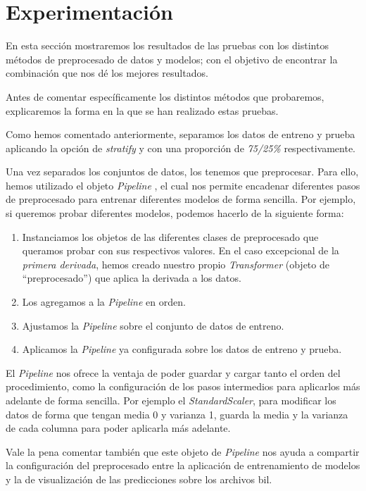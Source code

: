 \section{Experimentación}

En esta sección mostraremos los resultados de las pruebas con los distintos métodos de preprocesado de datos y modelos; con el objetivo de encontrar la combinación que nos dé los mejores resultados.

Antes de comentar específicamente los distintos métodos que probaremos, explicaremos la forma en la que se han realizado estas pruebas.

Como hemos comentado anteriormente, separamos los datos de entreno y prueba aplicando la opción de \textit{stratify} y con una proporción de \textit{75/25\%} respectivamente.

Una vez separados los conjuntos de datos, los tenemos que preprocesar. Para ello, hemos utilizado el objeto \textit{Pipeline} \cite{sklearnp32:online}, el cual nos permite encadenar diferentes pasos de preprocesado para entrenar diferentes modelos de forma sencilla. Por ejemplo, si queremos probar diferentes modelos, podemos hacerlo de la siguiente forma: 

\begin{enumerate}
    \item Instanciamos los objetos de las diferentes clases de preprocesado que queramos probar con sus respectivos valores. En el caso excepcional de la \textit{primera derivada}, hemos creado nuestro propio \textit{Transformer} (objeto de ``preprocesado'') que aplica la derivada a los datos.
    \item Los agregamos a la \textit{Pipeline} en orden.
    \item Ajustamos la \textit{Pipeline} sobre el conjunto de datos de entreno.
    \item Aplicamos la \textit{Pipeline} ya configurada sobre los datos de entreno y prueba. 
\end{enumerate}


El \textit{Pipeline} nos ofrece la ventaja de poder guardar y cargar tanto el orden del procedimiento, como la configuración de los pasos intermedios para aplicarlos más adelante de forma sencilla. Por ejemplo el \textit{StandardScaler}, para modificar los datos de forma que tengan media 0 y varianza 1, guarda la media y la varianza de cada columna para poder aplicarla más adelante.

Vale la pena comentar también que este objeto de \textit{Pipeline} nos ayuda a compartir la configuración del preprocesado entre la aplicación de entrenamiento de modelos y la de visualización de las predicciones sobre los archivos \gls{bil}.

